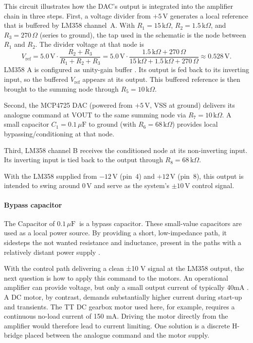 This circuit illustrates how the DAC’s output is integrated into the amplifier chain in three steps. 
First, a voltage divider from \(+5\,\mathrm{V}\) generates a local reference that is buffered by LM358 channel~A. 
With \(R_1=15\,\text{k}\Omega\), \(R_2=1.5\,\text{k}\Omega\), and \(R_3=270\,\Omega\) (series to ground), the tap used in the schematic is the node between \(R_1\) and \(R_2\). 
The divider voltage at that node is
\[
V_{\text{ref}} = 5.0\,\mathrm{V}\cdot 
\frac{R_2+R_3}{R_1+R_2+R_3}
= 5.0\,\mathrm{V}\cdot 
\frac{1.5\,\text{k}\Omega+270\,\Omega}{15\,\text{k}\Omega+1.5\,\text{k}\Omega+270\,\Omega}
\approx 0.528\,\mathrm{V}.
\]
LM358 A is configured as unity-gain buffer \cite[see][88]{Hüning:2014}. Its output is fed back to its inverting input, so the buffered \(V_{\text{ref}}\) appears at its output. 
This buffered reference is then brought to the summing node through \(R_5=10\,\text{k}\Omega\).

Second, the MCP4725 DAC (powered from \(+5\,\mathrm{V}\), VSS at ground) delivers its analogue command at \(\mathrm{VOUT}\) to the same summing node via \(R_7=10\,\text{k}\Omega\). 
A small capacitor \(C_1=0.1\,\mu\mathrm{F}\) to ground (with \(R_6=68\,\text{k}\Omega\)) provides local bypassing/conditioning at that node.

Third, LM358 channel B receives the conditioned node at its non-inverting input. Its inverting input is tied back to the output through \(R_8=68\,\text{k}\Omega\). 

With the LM358 supplied from \(-12\,\mathrm{V}\) (pin~4) and \(+12\,\mathrm{V}\) (pin~8), this output is intended to swing around \(0\,\mathrm{V}\) and serve as the system’s \(\pm 10\,\mathrm{V}\) control signal.


\paragraph{Bypass capacitor}
The Capacitor of $0.1\,\mu\mathrm{F}\ $ is a bypass capacitor. These small-value capacitors are used as a local power source. By providing a short, low-impedance path, it sidesteps the not wanted resistance and inductance, present in the paths with a relatively distant power supply \cite[see][139]{Cook:2010}.

With the control path delivering a clean ±10 V signal at the LM358 output, the next question is how to apply this command to the motors. An operational amplifier can provide voltage, but only a small output current of typically 40mA \cite[4]{OnSemiconductor:2011}. A DC motor, by contrast, demands substantially higher current during start-up and transients. The TT DC gearbox motor used here, for example, requires a continuous no-load current of 150 mA. Driving the motor directly from the amplifier would therefore lead to current limiting. One solution is a discrete H-bridge placed between the analogue command and the motor supply.

